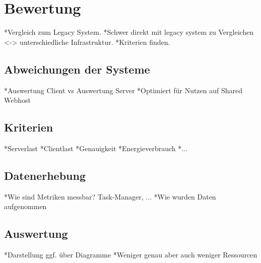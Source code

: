\chapter{Bewertung}
*Vergleich zum Legacy System.\newline
*Schwer direkt mit legacy system zu Vergleichen <-> unterschiedliche Infrastruktur.\newline
*Kriterien finden.\newline

\section{Abweichungen der Systeme}
*Auswertung Client vs Auswertung Server\newline
*Optimiert für Nutzen auf Shared Webhost\newline

\section{Kriterien}
*Serverlast\newline
*Clientlast\newline
*Genauigkeit\newline
*Energieverbrauch\newline
*...\newline

\section{Datenerhebung}
*Wie sind Metriken messbar? Task-Manager, ...\newline
*Wie wurden Daten aufgenommen\newline

\section{Auswertung}
*Darstellung ggf. über Diagramme\newline
*Weniger genau aber auch weniger Ressourcen\newline
